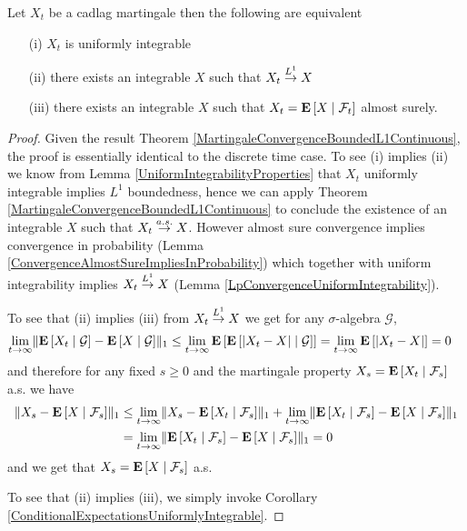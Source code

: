 \begin{thm}\label{L1MartingaleConvergenceTheoremContinuous}Let $X_t$ be
  a cadlag martingale then the following are equivalent
\begin{itemize}
\item[(i)]$X_t$ is uniformly  integrable
\item[(ii)]there exists an integrable $X$  such that
  $X_t \tolp{1} X$
\item[(iii)]there exists an integrable $X$ such that
  $X_t = \cexpectationlong{\mathcal{F}_t}{X}$ almost surely.
\end{itemize}
\end{thm}
\begin{proof}
Given the result Theorem
\ref{MartingaleConvergenceBoundedL1Continuous}, the proof is
essentially identical to the discrete time case.  
To see (i) implies (ii) we know from Lemma
\ref{UniformIntegrabilityProperties} that $X_t$ uniformly integrable
implies $L^1$ boundedness, hence we can apply Theorem
\ref{MartingaleConvergenceBoundedL1Continuous}
to conclude the existence of an integrable $X$ such that $X_t \toas
X$.  However almost sure convergence implies convergence in
probability (Lemma \ref{ConvergenceAlmostSureImpliesInProbability})
which together with uniform integrability implies $X_t \tolp{1} X$
(Lemma \ref{LpConvergenceUniformIntegrability}).

To see that (ii) implies (iii) from $X_t \tolp{1} X$ we get for any
$\sigma$-algebra $\mathcal{G}$,
\begin{align*}
\lim_{t \to \infty}
\norm{\cexpectationlong{\mathcal{G}}{X_t}
    -\cexpectationlong{\mathcal{G}}{X} }_1 &\leq
\lim_{t \to \infty}\expectation{\cexpectationlong{\mathcal{G}}{\abs{
      X_t- X}}} = \lim_{t \to \infty}\expectation{\abs{X_t -X}} = 0
\end{align*}
and therefore for any fixed $s \geq 0$ and the martingale property
$X_s = \cexpectationlong{\mathcal{F}_s}{X_t}$ a.s. we have
\begin{align*}
\norm{X_s - \cexpectationlong{\mathcal{F}_s}{X}}_1 &\leq \lim_{t \to
  \infty} \norm{X_s -
  \cexpectationlong{\mathcal{F}_s}{X_t}}_1  + \lim_{t \to
  \infty} \norm{\cexpectationlong{\mathcal{F}_s}{X_t}-
  \cexpectationlong{\mathcal{F}_s}{X}}_1 \\
&= \lim_{t \to
  \infty} \norm{\cexpectationlong{\mathcal{F}_s}{X_t}-
  \cexpectationlong{\mathcal{F}_s}{X}}_1=0
\end{align*}
and we get that $X_s = \cexpectationlong{\mathcal{F}_s}{X}$ a.s.

To see that (ii) implies (iii), we simply invoke Corollary \ref{ConditionalExpectationsUniformlyIntegrable}.
\end{proof}

